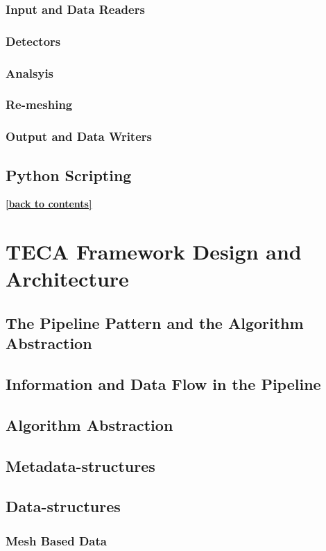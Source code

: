 \documentclass[a4paper,10pt,DIV=12]{scrreprt}
\begin{document}
\subsection{Input and Data Readers}
\subsection{Detectors}
\subsection{Analsyis}
\subsection{Re-meshing}
\subsection{Output and Data Writers}
\section{Python Scripting}
\hyperlink{toc}{\footnotesize \bf [back to contents]}

\chapter{TECA Framework Design and Architecture}
\section{The Pipeline Pattern and the Algorithm Abstraction}
\section{Information and Data Flow in the Pipeline}
\section{Algorithm Abstraction}
\section{Metadata-structures}
\section{Data-structures}
\subsection{Mesh Based Data}
\end{document}
